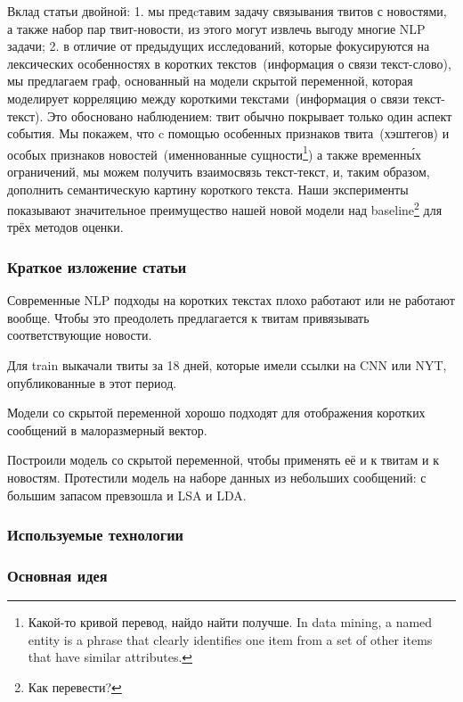 \documentclass[12pt,a4paper,oneside]{extarticle}
\begin{document}
        Вклад статьи двойной:
        1. мы предcтавим задачу связывания твитов с новостями, а также набор пар твит-новости, из этого могут извлечь выгоду многие NLP задачи;
        2. в отличие от предыдущих исследований, которые фокусируются на лексических особенностях в коротких текстов~(информация о связи текст-слово), мы предлагаем граф, основанный на модели скрытой переменной, которая моделирует корреляцию между короткими текстами~(информация о связи текст-текст).
        Это обосновано наблюдением: твит обычно покрывает только один аспект события.
        Мы покажем, что c помощью особенных признаков твита~(хэштегов) и особых признаков новостей~(именнованные сущности\footnote{Какой-то кривой перевод, найдо найти получше. In data mining, a named entity is a phrase that clearly identifies one item from a set of other items that have similar attributes.}) а также временн\'{ы}х ограничений, мы можем получить взаимосвязь текст-текст, и, таким образом, дополнить семантическую картину короткого текста.
        Наши эксперименты показывают значительное преимущество нашей новой модели над baseline\footnote{Как перевести?} для трёх методов оценки.

        \subsubsection{Краткое изложение статьи}
        Современные NLP подходы на коротких текстах плохо работают или не работают вообще.
        Чтобы это преодолеть предлагается к твитам привязывать соответствующие новости.

        Для train выкачали твиты за 18 дней, которые имели ссылки на CNN или NYT, опубликованные в этот период.

        Модели со скрытой переменной хорошо подходят для отображения коротких сообщений в малоразмерный вектор.

        Построили модель со скрытой переменной, чтобы применять её и к твитам и к новостям. Протестили модель на наборе данных из небольших сообщений: с большим запасом превзошла и LSA и LDA.


        \subsubsection{Используемые технологии}

        \subsubsection{Основная идея}
        
\end{document}

